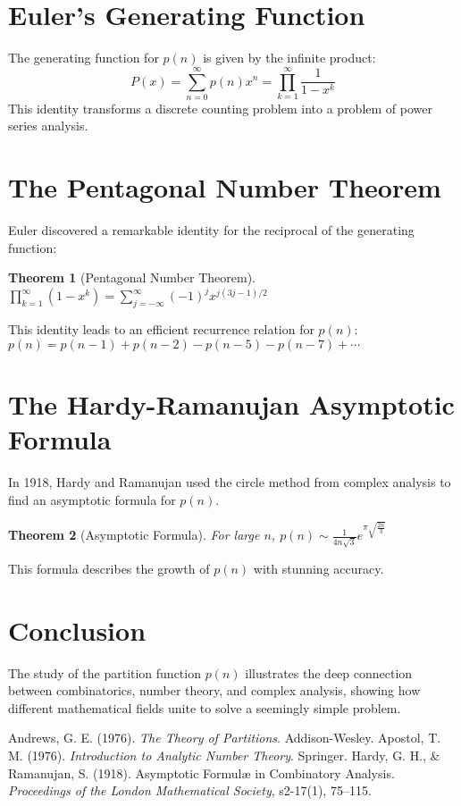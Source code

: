 \documentclass[12pt, a4paper]{article}
\newtheorem{theorem}{Theorem}[section]
\theoremstyle{definition}
\theoremstyle{remark}
\begin{document}
\section{Euler's Generating Function}
The generating function for $p(n)$ is given by the infinite product:
\begin{equation}
P(x) = \sum_{n=0}^{\infty} p(n)x^n = \prod_{k=1}^{\infty} \frac{1}{1-x^k}
\end{equation}
This identity transforms a discrete counting problem into a problem of power series analysis.

\section{The Pentagonal Number Theorem}
Euler discovered a remarkable identity for the reciprocal of the generating function:
\begin{theorem}[Pentagonal Number Theorem]
$\prod_{k=1}^{\infty} (1-x^k) = \sum_{j=-\infty}^{\infty} (-1)^j x^{j(3j-1)/2}$
\end{theorem}
This identity leads to an efficient recurrence relation for $p(n)$:
$p(n) = p(n-1) + p(n-2) - p(n-5) - p(n-7) + \cdots$

\section{The Hardy-Ramanujan Asymptotic Formula}
In 1918, Hardy and Ramanujan used the circle method from complex analysis to find an asymptotic formula for $p(n)$.
\begin{theorem}[Asymptotic Formula]
For large $n$, $p(n) \sim \frac{1}{4n\sqrt{3}} e^{\pi \sqrt{\frac{2n}{3}}}$
\end{theorem}
This formula describes the growth of $p(n)$ with stunning accuracy.

\section{Conclusion}
The study of the partition function $p(n)$ illustrates the deep connection between combinatorics, number theory, and complex analysis, showing how different mathematical fields unite to solve a seemingly simple problem.

\begin{thebibliography}{9}
 Andrews, G. E. (1976). \textit{The Theory of Partitions}. Addison-Wesley.
 Apostol, T. M. (1976). \textit{Introduction to Analytic Number Theory}. Springer.
 Hardy, G. H., \& Ramanujan, S. (1918). Asymptotic Formulæ in Combinatory Analysis. \textit{Proceedings of the London Mathematical Society}, s2-17(1), 75–115.
\end{thebibliography}
\end{document}
